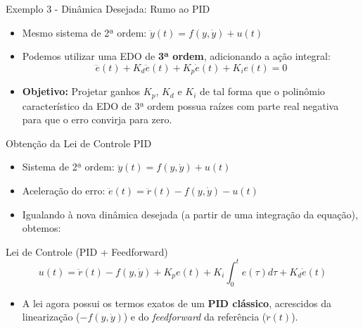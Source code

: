 \documentclass[11pt, aspectratio=169]{beamer}
\begin{document}
\begin{frame}{Exemplo 3 - Dinâmica Desejada: Rumo ao PID}
    \begin{itemize}
        \item Mesmo sistema de 2ª ordem: $\ddot{y}(t) = f(y, \dot{y}) + u(t)$
        \item Podemos utilizar uma EDO de \textbf{3ª ordem}, adicionando a ação integral:
        \[ \dddot{e}(t) + K_d \ddot{e}(t) + K_p \dot{e}(t) + K_i e(t) = 0 \]
        \item \textbf{Objetivo:} Projetar ganhos $K_p$, $K_d$ e $K_i$ de tal forma que o polinômio característico da EDO de 3ª ordem possua raízes com parte real negativa para que o erro convirja para zero.
    \end{itemize}
\end{frame}

\begin{frame}{Obtenção da Lei de Controle PID}
    \begin{itemize}
        \item Sistema de 2ª ordem: $\ddot{y}(t) = f(y, \dot{y}) + u(t)$
        \item Aceleração do erro: $\ddot{e}(t) = \ddot{r}(t) - f(y, \dot{y}) - u(t)$
        \item Igualando à nova dinâmica desejada (a partir de uma integração da equação), obtemos:
    \end{itemize}
    
    \begin{alertblock}{Lei de Controle (PID + Feedforward)}
        \[ u(t) = \ddot{r}(t) - f(y, \dot{y}) + K_p e(t) + K_i \int_0^t e(\tau) d\tau + K_d \dot{e}(t) \]
    \end{alertblock}
    
    \begin{itemize}
        \item A lei agora possui os termos exatos de um \textbf{PID clássico}, acrescidos da linearização ($-f(y, \dot{y})$) e do \textit{feedforward} da referência ($\ddot{r}(t)$).
    \end{itemize}
\end{frame}
\end{document}
